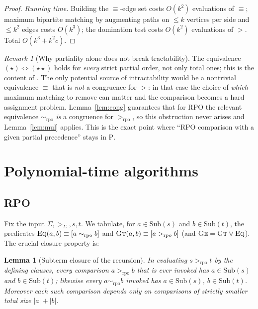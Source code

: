 \documentclass{amsart}
\newtheorem{lemma}{Lemma}
\theoremstyle{definition}
\theoremstyle{remark}
\newtheorem{remark}{Remark}
\newcommand{\rpo}{>_{\mathrm{rpo}}}
\newcommand{\sig}{\Sigma}
\newcommand{\prc}{>_{\sig}}
\newcommand{\size}[1]{|#1|}
\begin{document}
\begin{proof}
\emph{Running time.} Building the $\equiv$-edge set costs $O(k^{2})$ evaluations
of $\equiv$; maximum bipartite matching by augmenting paths on $\le k$ vertices
per side and $\le k^{2}$ edges costs $O(k^{3})$; the domination test costs
$O(k^{2})$ evaluations of $>$. Total $O(k^{3}+k^{2}c)$.
\end{proof}

\begin{remark}[Why partiality alone does not break tractability]
The equivalence $(\star)\Leftrightarrow(\star\star)$ holds for \emph{every}
strict partial order, not only total ones; this is the content of \cite{DM}. The
only potential source of intractability would be a nontrivial equivalence
$\equiv$ that is \emph{not} a congruence for $>$: in that case the choice of
\emph{which} maximum matching to remove can matter and the comparison becomes a
hard assignment problem. Lemma~\ref{lem:cong} guarantees that for RPO the
relevant equivalence $\sim_{\mathrm{rpo}}$ \emph{is} a congruence for $\rpo$, so
this obstruction never arises and Lemma~\ref{lem:mul} applies. This is the exact
point where ``RPO comparison with a given partial precedence'' stays in
$\mathrm{P}$.
\end{remark}

\section{Polynomial-time algorithms}

\subsection{RPO}
Fix the input $\sig,\prc,s,t$. We tabulate, for $a\in\mathrm{Sub}(s)$ and
$b\in\mathrm{Sub}(t)$, the predicates
$\textsc{Eq}(a,b)\equiv[a\sim_{\mathrm{rpo}}b]$ and
$\textsc{Gt}(a,b)\equiv[a\rpo b]$ (and $\textsc{Ge}=\textsc{Gt}\lor\textsc{Eq}$).
The crucial closure property is:

\begin{lemma}[Subterm closure of the recursion]\label{lem:closure}
In evaluating $s\rpo t$ by the defining clauses, every comparison $a\rpo b$ that
is ever invoked has $a\in\mathrm{Sub}(s)$ and $b\in\mathrm{Sub}(t)$; likewise
every $a\sim_{\mathrm{rpo}}b$ invoked has $a\in\mathrm{Sub}(s)$,
$b\in\mathrm{Sub}(t)$. Moreover each such comparison depends only on comparisons
of strictly smaller total size $\size{a}+\size{b}$.
\end{lemma}
\end{document}
